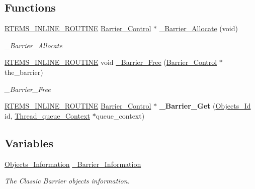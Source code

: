 \subsection*{Functions}
\begin{DoxyCompactItemize}
\item 
\mbox{\hyperlink{group__RTEMSScoreBaseDefs_gac216239df231d5dbd15e3520b0b9313f}{R\+T\+E\+M\+S\+\_\+\+I\+N\+L\+I\+N\+E\+\_\+\+R\+O\+U\+T\+I\+NE}} \mbox{\hyperlink{structBarrier__Control}{Barrier\+\_\+\+Control}} $\ast$ \mbox{\hyperlink{group__ClassicBarrierImpl_gad929c5e3d1b4a3c1343769a04d9a14ac}{\+\_\+\+Barrier\+\_\+\+Allocate}} (void)
\begin{DoxyCompactList}\small\item\em \+\_\+\+Barrier\+\_\+\+Allocate \end{DoxyCompactList}\item 
\mbox{\hyperlink{group__RTEMSScoreBaseDefs_gac216239df231d5dbd15e3520b0b9313f}{R\+T\+E\+M\+S\+\_\+\+I\+N\+L\+I\+N\+E\+\_\+\+R\+O\+U\+T\+I\+NE}} void \mbox{\hyperlink{group__ClassicBarrierImpl_gae78f26c66aa3821e1afd6ae46b92adc0}{\+\_\+\+Barrier\+\_\+\+Free}} (\mbox{\hyperlink{structBarrier__Control}{Barrier\+\_\+\+Control}} $\ast$the\+\_\+barrier)
\begin{DoxyCompactList}\small\item\em \+\_\+\+Barrier\+\_\+\+Free \end{DoxyCompactList}\item 
\mbox{\label{group__ClassicBarrierImpl_gaddb2ead3ee36662670debcccad61093d}} 
\mbox{\hyperlink{group__RTEMSScoreBaseDefs_gac216239df231d5dbd15e3520b0b9313f}{R\+T\+E\+M\+S\+\_\+\+I\+N\+L\+I\+N\+E\+\_\+\+R\+O\+U\+T\+I\+NE}} \mbox{\hyperlink{structBarrier__Control}{Barrier\+\_\+\+Control}} $\ast$ {\bfseries \+\_\+\+Barrier\+\_\+\+Get} (\mbox{\hyperlink{group__RTEMSScoreObject_ga5821f52a51072941bdd603e542d0863e}{Objects\+\_\+\+Id}} id, \mbox{\hyperlink{structThread__queue__Context}{Thread\+\_\+queue\+\_\+\+Context}} $\ast$queue\+\_\+context)
\end{DoxyCompactItemize}
\subsection*{Variables}
\begin{DoxyCompactItemize}
\item 
\mbox{\label{group__ClassicBarrierImpl_ga2b942bfe3ee502baf4b1d62b4c803f72}} 
\mbox{\hyperlink{structObjects__Information}{Objects\+\_\+\+Information}} \mbox{\hyperlink{group__ClassicBarrierImpl_ga2b942bfe3ee502baf4b1d62b4c803f72}{\+\_\+\+Barrier\+\_\+\+Information}}
\begin{DoxyCompactList}\small\item\em The Classic Barrier objects information. \end{DoxyCompactList}\end{DoxyCompactItemize}


